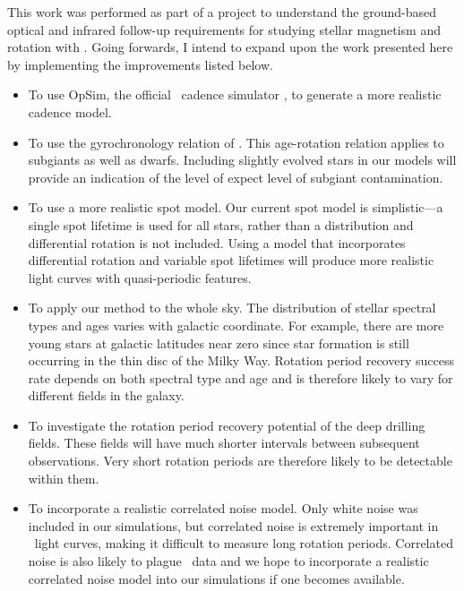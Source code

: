 This work was performed as part of a project to understand the ground-based
optical and infrared follow-up requirements for studying stellar magnetism and
rotation with \LSST.
Going forwards, I intend to expand upon the work presented here by
implementing the improvements listed below.
\begin{itemize}
\item{To use OpSim, the official \LSST\ cadence simulator \citep{Ridgway2012},
to generate a more realistic cadence model.}
\item{To use the gyrochronology relation of \citet{Vansaders2013}.
This age-rotation relation applies to subgiants as well as dwarfs.
Including slightly evolved stars in our models will provide an indication of
the level of expect level of subgiant contamination.}
\item{To use a more realistic spot model.
Our current spot model is simplistic---a single spot lifetime is used for all
stars, rather than a distribution and differential rotation is not included.
Using a model that incorporates differential rotation and variable spot
lifetimes will produce more realistic light curves with quasi-periodic
features.}
\item{To apply our method to the whole sky.
The distribution of stellar spectral types and ages varies with galactic
coordinate.
For example, there are more young stars at galactic latitudes near zero since
star formation is still occurring in the thin disc of the Milky Way.
Rotation period recovery success rate depends on both spectral type and
age and is therefore likely to vary for different fields in the galaxy.}
\item{To investigate the rotation period recovery potential of
the deep drilling fields.
These fields will have much shorter intervals between subsequent
observations.
Very short rotation periods are therefore likely to be detectable within
them.}
\item{To incorporate a realistic correlated noise model.
Only white noise was included in our simulations, but correlated noise is
extremely important in \kepler\ light curves, making it difficult to measure
long rotation periods.
Correlated noise is also likely to plague \LSST\ data and we hope to
incorporate a realistic correlated noise model into our simulations if one
becomes available.}
\end{itemize}
